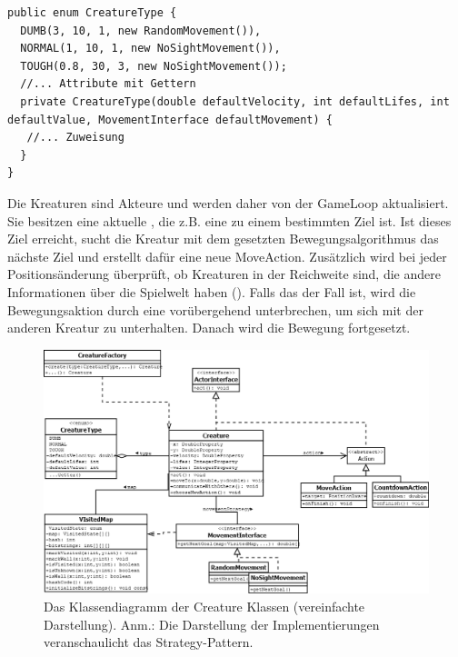 \begin{lstlisting}[caption={Enum der Kreaturen Arten mit Konfiguration der default Werte (gekürzt).}, captionpos=b]
public enum CreatureType {
  DUMB(3, 10, 1, new RandomMovement()),
  NORMAL(1, 10, 1, new NoSightMovement()),
  TOUGH(0.8, 30, 3, new NoSightMovement());
  //... Attribute mit Gettern
  private CreatureType(double defaultVelocity, int defaultLifes, int defaultValue, MovementInterface defaultMovement) {
   //... Zuweisung
  }
}
\end{lstlisting}

Die Kreaturen sind Akteure und werden daher von der GameLoop aktualisiert. Sie besitzen eine aktuelle , die z.B. eine  zu einem bestimmten Ziel ist. Ist dieses Ziel erreicht, sucht die Kreatur mit dem gesetzten Bewegungsalgorithmus das nächste Ziel und erstellt dafür eine neue MoveAction. Zusätzlich wird bei jeder Positionsänderung überprüft, ob Kreaturen in der Reichweite sind, die andere Informationen über die Spielwelt haben (). Falls das der Fall ist, wird die Bewegungsaktion durch eine  vorübergehend unterbrechen, um sich mit der anderen Kreatur zu unterhalten. Danach wird die Bewegung fortgesetzt.

\begin{figure}[htb]
  \centering
  \includegraphics[width=\linewidth]{images/creature-classdiagram.png}
  \caption{Das Klassendiagramm der Creature Klassen (vereinfachte Darstellung). Anm.: Die Darstellung der  Implementierungen veranschaulicht das Strategy-Pattern.}
\end{figure}

